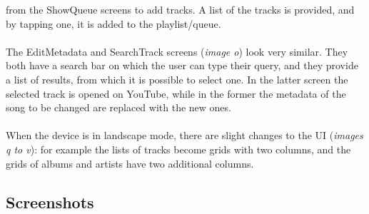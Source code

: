 \documentclass{article}
\begin{document}
from the ShowQueue screens to add tracks. A list of the tracks is provided, and
by tapping one, it is added to the playlist/queue.
\\\\
The EditMetadata and SearchTrack screens (\textit{image o}) look very similar. They
both have a search bar on which the user can type their query, and they provide
a list of results, from which it is possible to select one. In the latter screen
the selected track is opened on YouTube, while in the former the metadata of the
song to be changed are replaced with the new ones.
\\\\
When the device is in landscape mode, there are slight changes to the UI (\textit{images
q to v}): for example the lists of tracks become grids with two columns, and
the grids of albums and artists have two additional columns.

\subsection{Screenshots}
\end{document}
